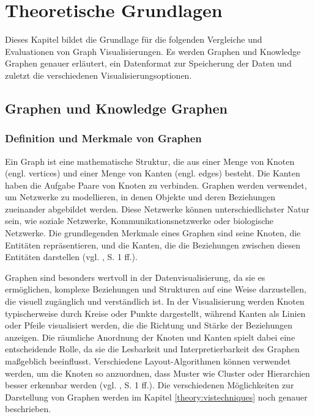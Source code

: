
\chapter{Theoretische Grundlagen}
\label{theory}

Dieses Kapitel bildet die Grundlage für die folgenden Vergleiche und Evaluationen von Graph Visualisierungen. Es werden Graphen und Knowledge Graphen genauer erläutert, ein Datenformat zur Speicherung der Daten und zuletzt die verschiedenen Visualisierungsoptionen. 

\section{Graphen und Knowledge Graphen}

\subsection{Definition und Merkmale von Graphen}

Ein Graph ist eine mathematische Struktur, die aus einer Menge von Knoten (engl. vertices) und einer Menge von Kanten (engl. edges) besteht. Die Kanten haben die Aufgabe Paare von Knoten zu verbinden. Graphen werden verwendet, um Netzwerke zu modellieren, in denen Objekte und deren Beziehungen zueinander abgebildet werden. Diese Netzwerke können unterschiedlichster Natur sein, wie soziale Netzwerke, Kommunikationsnetzwerke oder biologische Netzwerke. Die grundlegenden Merkmale eines Graphen sind seine Knoten, die Entitäten repräsentieren, und die Kanten, die die Beziehungen zwischen diesen Entitäten darstellen (vgl. \cite{graphIntroduction:Wilson}, S. 1 ff.).

Graphen sind besonders wertvoll in der Datenvisualisierung, da sie es ermöglichen, komplexe Beziehungen und Strukturen auf eine Weise darzustellen, die visuell zugänglich und verständlich ist. In der Visualisierung werden Knoten typischerweise durch Kreise oder Punkte dargestellt, während Kanten als Linien oder Pfeile visualisiert werden, die die Richtung und Stärke der Beziehungen anzeigen. Die räumliche Anordnung der Knoten und Kanten spielt dabei eine entscheidende Rolle, da sie die Lesbarkeit und Interpretierbarkeit des Graphen maßgeblich beeinflusst. Verschiedene Layout-Algorithmen können verwendet werden, um die Knoten so anzuordnen, dass Muster wie Cluster oder Hierarchien besser erkennbar werden (vgl. \cite{graphIntroduction:Wilson}, S. 1 ff.). Die verschiedenen Möglichkeiten zur Darstellung von Graphen werden im Kapitel \ref{theory:vistechniques} noch genauer beschrieben.

